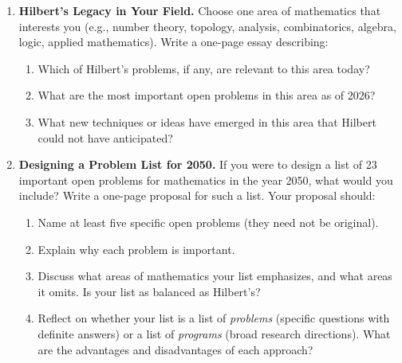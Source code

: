 \begin{enumerate}
    \item \textbf{Hilbert's Legacy in Your Field.}
    Choose one area of mathematics that interests you (e.g., number theory, topology, analysis, combinatorics, algebra, logic, applied mathematics). Write a one-page essay describing:
    \begin{enumerate}
        \item Which of Hilbert's problems, if any, are relevant to this area today?
        \item What are the most important open problems in this area as of 2026?
        \item What new techniques or ideas have emerged in this area that Hilbert could not have anticipated?
    \end{enumerate}

    \item[$\star$] \textbf{Designing a Problem List for 2050.}
    If you were to design a list of 23 important open problems for mathematics in the year 2050, what would you include? Write a one-page proposal for such a list. Your proposal should:
    \begin{enumerate}
        \item Name at least five specific open problems (they need not be original).
        \item Explain why each problem is important.
        \item Discuss what areas of mathematics your list emphasizes, and what areas it omits. Is your list as balanced as Hilbert's?
        \item Reflect on whether your list is a list of \emph{problems} (specific questions with definite answers) or a list of \emph{programs} (broad research directions). What are the advantages and disadvantages of each approach?
    \end{enumerate}

\end{enumerate}
